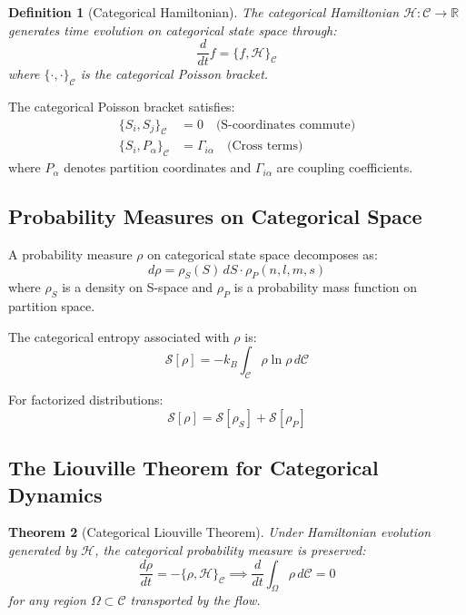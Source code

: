 \documentclass[twocolumn,10pt]{article}
\newtheorem{theorem}{Theorem}[section]
\newtheorem{definition}[theorem]{Definition}
\begin{document}
\begin{definition}[Categorical Hamiltonian]
The categorical Hamiltonian $\mathcal{H}: \mathcal{C} \to \mathbb{R}$ generates time evolution on categorical state space through:
\begin{equation}
    \frac{d}{dt}f = \{f, \mathcal{H}\}_{\mathcal{C}}
\end{equation}
where $\{\cdot, \cdot\}_{\mathcal{C}}$ is the categorical Poisson bracket.
\end{definition}

The categorical Poisson bracket satisfies:
\begin{align}
    \{S_i, S_j\}_{\mathcal{C}} &= 0 \quad \text{(S-coordinates commute)} \\
    \{S_i, P_\alpha\}_{\mathcal{C}} &= \Gamma_{i\alpha} \quad \text{(Cross terms)}
\end{align}
where $P_\alpha$ denotes partition coordinates and $\Gamma_{i\alpha}$ are coupling coefficients.

\subsection{Probability Measures on Categorical Space}

A probability measure $\rho$ on categorical state space decomposes as:
\begin{equation}
    d\rho = \rho_S(S) \, dS \cdot \rho_P(n, l, m, s)
\end{equation}
where $\rho_S$ is a density on S-space and $\rho_P$ is a probability mass function on partition space.

The categorical entropy associated with $\rho$ is:
\begin{equation}
    \mathcal{S}[\rho] = -k_B \int_{\mathcal{C}} \rho \ln \rho \, d\mathcal{C}
\end{equation}

For factorized distributions:
\begin{equation}
    \mathcal{S}[\rho] = \mathcal{S}[\rho_S] + \mathcal{S}[\rho_P]
\end{equation}

\subsection{The Liouville Theorem for Categorical Dynamics}

\begin{theorem}[Categorical Liouville Theorem]
Under Hamiltonian evolution generated by $\mathcal{H}$, the categorical probability measure is preserved:
\begin{equation}
    \frac{d\rho}{dt} = -\{\rho, \mathcal{H}\}_{\mathcal{C}} \implies \frac{d}{dt}\int_\Omega \rho \, d\mathcal{C} = 0
\end{equation}
for any region $\Omega \subset \mathcal{C}$ transported by the flow.
\end{theorem}
\end{document}
